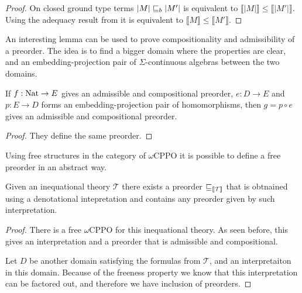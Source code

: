\begin{ensps}
\begin{proof}
    On closed ground type terms $|M| \sqsubseteq_b |M'|$ is equivalent 
    to $\llbracket |M| \rrbracket \leq \llbracket |M'| \rrbracket$.
    Using the adequacy result from \cite{plotkin2001adequacy} 
    it is equivalent to $\llbracket M \rrbracket \leq \llbracket M' \rrbracket$.
\end{proof}
\end{ensps}

An interesting lemma can be used to prove compositionality 
and admissibility of a preorder. The idea is to find a 
bigger domain where the properties are clear, and 
an embedding-projection pair of $\Sigma$-continuous 
algebras between the two domains. 

\begin{alemma}
    If $f : \textnormal{Nat} \to E$ gives an admissible and 
    compositional preorder,
    $e : D \to E$  and $p : E \to D$ forms 
    an embedding-projection pair of homomorphisms,
    then $g = p \circ e$ gives an admissible 
    and compositional preorder.
\end{alemma}

\begin{proof}
    They define the same preorder.
\end{proof}

Using free structures in the category 
of $\omega$CPPO it is possible to define 
a free preorder in an abstract way.

\begin{alemma}
    \label{lem:freedomainpreorder}
    Given an inequational theory $\mathcal{T}$
    there exists a preorder $\sqsubseteq_{\llbracket \mathcal{T} \rrbracket}$
    that is obtnained using a denotational 
    intepretation and contains any preorder 
    given by such interpretation.
\end{alemma}

\begin{ensps}
\begin{proof}
    There is a free $\omega$CPPO for this inequational 
    theory. As seen before, this gives an interpretation
    and a preorder that is admissible and compositional.
    
    Let $D$ be another domain satisfying the formulas from $\mathcal{T}$,
    and an interpretaiton in this domain. Because of the 
    freeness property we know that this interpretation 
    can be factored out, and therefore we have 
    inclusion of preorders.
\end{proof}
\end{ensps}
